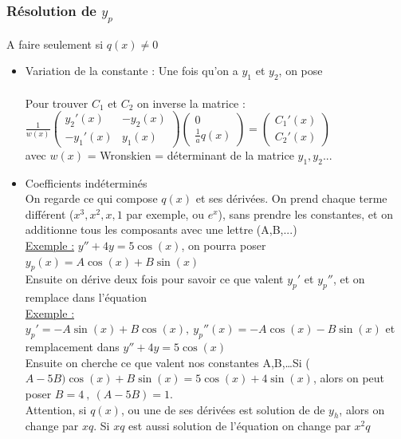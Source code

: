 \documentclass[12pt,a4paper]{article}
\renewcommand{\)}{\right)}
\renewcommand{\(}{\left(}
\begin{document}
\subsubsection{Résolution de $y_p$}
A faire seulement si $q(x) \neq 0$
\begin{itemize}
	\item 	Variation de la constante :	Une fois qu'on a $y_1$ et $y_2$, on pose\\
			\\
			Pour trouver $C_1$ et $C_2$ on inverse la matrice :\\
			$\frac{1}{w(x)}\begin{pmatrix}
			y_2'(x) & -y_2(x)\\
			-y_1'(x) & y_1(x)
			\end{pmatrix} \begin{pmatrix}
			0\\
			\frac{1}{a}q(x)
			\end{pmatrix}  = \begin{pmatrix}
			C_1'(x)\\
			C_2'(x)
			\end{pmatrix}$ \\
			avec $w(x)$ = Wronskien = déterminant de la matrice $y_1,y_2...$
	\item 	Coefficients indéterminés\\
			On regarde ce qui compose $q(x)$ et ses dérivées. On prend chaque terme différent ($x^3, x^2, x, 1$ par exemple, ou $e^x$), sans prendre les constantes, et on additionne tous les composants avec une lettre (A,B,...)\\
			\underline{Exemple :} $y'' + 4y = 5\cos(x)$, on pourra poser $y_p(x) = A\cos(x) + B\sin(x)$\\
			Ensuite on dérive deux fois pour savoir ce que valent $y_p'$ et $y_p''$, et on remplace dans l'équation\\
			\underline{Exemple :} $y_p' = -A\sin(x) + B\cos(x),\ y_p''(x) = -A\cos(x) -B\sin(x)$ et remplacement dans $y'' + 4y = 5\cos(x)$\\
			Ensuite on cherche ce que valent nos constantes A,B,\ldots Si ($A-5B)\cos(x) + B\sin(x) = 5\cos(x) + 4\sin(x)$, alors on peut poser $B = 4\ , \ (A-5B) = 1$.\\
			Attention, si $q(x)$, ou une de ses dérivées est solution de de $y_h$, alors on change par $xq$. Si $xq$ est aussi solution de l'équation on change par $x^2q$
\end{itemize}
\end{document}
